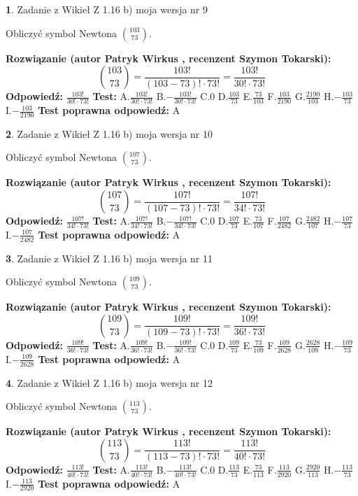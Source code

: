\documentclass[12pt, a4paper]{article}
\theoremstyle{definition} %
\newtheorem{zad}{}
\newcommand{\zadStart}[1]{\begin{zad}#1\newline}
\newcommand{\zadStop}{\end{zad}}
\newcommand{\rozwStart}[2]{\noindent \textbf{Rozwiązanie (autor #1 , recenzent #2): }\newline}
\newcommand{\rozwStop}{\newline}
\newcommand{\odpStart}{\noindent \textbf{Odpowiedź:}\newline}
\newcommand{\odpStop}{\newline}
\newcommand{\testStart}{\noindent \textbf{Test:}\newline}
\newcommand{\testStop}{\newline}
\newcommand{\kluczStart}{\noindent \textbf{Test poprawna odpowiedź:}\newline}
\newcommand{\kluczStop}{\newline}
\begin{document}
\zadStart{Zadanie z Wikieł Z 1.16 b) moja wersja nr 9}

Obliczyć symbol Newtona ${103 \choose 73}$.
\zadStop
\rozwStart{Patryk Wirkus}{Szymon Tokarski}
$${103 \choose 73} = \frac{103!}{(103-73)! \cdot 73!} = \frac{103!}{30! \cdot 73!}$$
\rozwStop
\odpStart
$\frac{103!}{30! \cdot 73!}$
\odpStop
\testStart
A.$\frac{103!}{30! \cdot 73!}$ B.$-\frac{103!}{30! \cdot 73!}$ C.$0$ D.$\frac{103}{73}$ E.$\frac{73}{103}$
F.$\frac{103}{2190}$ G.$\frac{2190}{103}$
H.$-\frac{103}{73}$
I.$-\frac{103}{2190}$
\testStop
\kluczStart
A
\kluczStop



\zadStart{Zadanie z Wikieł Z 1.16 b) moja wersja nr 10}

Obliczyć symbol Newtona ${107 \choose 73}$.
\zadStop
\rozwStart{Patryk Wirkus}{Szymon Tokarski}
$${107 \choose 73} = \frac{107!}{(107-73)! \cdot 73!} = \frac{107!}{34! \cdot 73!}$$
\rozwStop
\odpStart
$\frac{107!}{34! \cdot 73!}$
\odpStop
\testStart
A.$\frac{107!}{34! \cdot 73!}$ B.$-\frac{107!}{34! \cdot 73!}$ C.$0$ D.$\frac{107}{73}$ E.$\frac{73}{107}$
F.$\frac{107}{2482}$ G.$\frac{2482}{107}$
H.$-\frac{107}{73}$
I.$-\frac{107}{2482}$
\testStop
\kluczStart
A
\kluczStop



\zadStart{Zadanie z Wikieł Z 1.16 b) moja wersja nr 11}

Obliczyć symbol Newtona ${109 \choose 73}$.
\zadStop
\rozwStart{Patryk Wirkus}{Szymon Tokarski}
$${109 \choose 73} = \frac{109!}{(109-73)! \cdot 73!} = \frac{109!}{36! \cdot 73!}$$
\rozwStop
\odpStart
$\frac{109!}{36! \cdot 73!}$
\odpStop
\testStart
A.$\frac{109!}{36! \cdot 73!}$ B.$-\frac{109!}{36! \cdot 73!}$ C.$0$ D.$\frac{109}{73}$ E.$\frac{73}{109}$
F.$\frac{109}{2628}$ G.$\frac{2628}{109}$
H.$-\frac{109}{73}$
I.$-\frac{109}{2628}$
\testStop
\kluczStart
A
\kluczStop



\zadStart{Zadanie z Wikieł Z 1.16 b) moja wersja nr 12}

Obliczyć symbol Newtona ${113 \choose 73}$.
\zadStop
\rozwStart{Patryk Wirkus}{Szymon Tokarski}
$${113 \choose 73} = \frac{113!}{(113-73)! \cdot 73!} = \frac{113!}{40! \cdot 73!}$$
\rozwStop
\odpStart
$\frac{113!}{40! \cdot 73!}$
\odpStop
\testStart
A.$\frac{113!}{40! \cdot 73!}$ B.$-\frac{113!}{40! \cdot 73!}$ C.$0$ D.$\frac{113}{73}$ E.$\frac{73}{113}$
F.$\frac{113}{2920}$ G.$\frac{2920}{113}$
H.$-\frac{113}{73}$
I.$-\frac{113}{2920}$
\testStop
\kluczStart
A
\kluczStop
\end{document}
